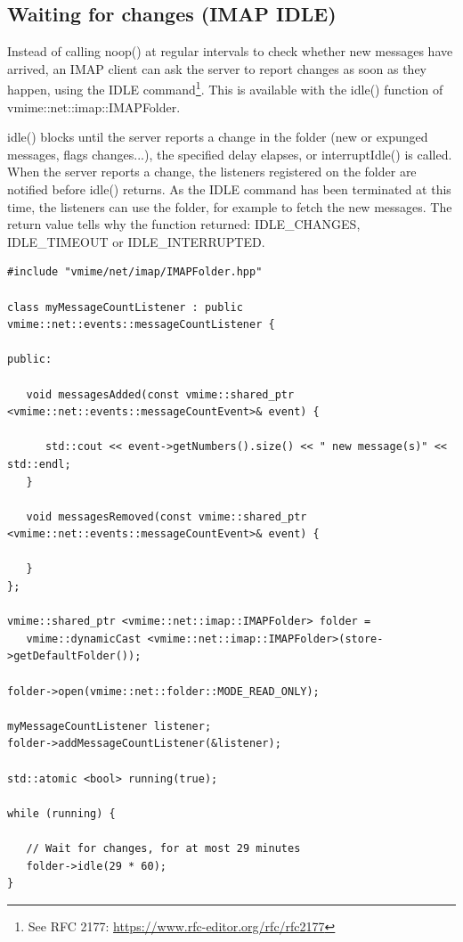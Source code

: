 \subsection{Waiting for changes (IMAP IDLE)} %

Instead of calling {\vcode noop()} at regular intervals to check whether new
messages have arrived, an IMAP client can ask the server to report changes as
soon as they happen, using the IDLE command\footnote{See RFC 2177:
\url{https://www.rfc-editor.org/rfc/rfc2177}}. This is available with the
{\vcode idle()} function of {\vcode vmime::net::imap::IMAPFolder}.

{\vcode idle()} blocks until the server reports a change in the folder (new or
expunged messages, flags changes...), the specified delay elapses, or
{\vcode interruptIdle()} is called. When the server reports a change, the
listeners registered on the folder are notified before {\vcode idle()}
returns. As the IDLE command has been terminated at this time, the listeners
can use the folder, for example to fetch the new messages. The return value
tells why the function returned: {\vcode IDLE\_CHANGES}, {\vcode IDLE\_TIMEOUT}
or {\vcode IDLE\_INTERRUPTED}.

\begin{lstlisting}[caption={Waiting for new messages}]
#include "vmime/net/imap/IMAPFolder.hpp"

class myMessageCountListener : public vmime::net::events::messageCountListener {

public:

   void messagesAdded(const vmime::shared_ptr <vmime::net::events::messageCountEvent>& event) {

      std::cout << event->getNumbers().size() << " new message(s)" << std::endl;
   }

   void messagesRemoved(const vmime::shared_ptr <vmime::net::events::messageCountEvent>& event) {

   }
};

vmime::shared_ptr <vmime::net::imap::IMAPFolder> folder =
   vmime::dynamicCast <vmime::net::imap::IMAPFolder>(store->getDefaultFolder());

folder->open(vmime::net::folder::MODE_READ_ONLY);

myMessageCountListener listener;
folder->addMessageCountListener(&listener);

std::atomic <bool> running(true);

while (running) {

   // Wait for changes, for at most 29 minutes
   folder->idle(29 * 60);
}
\end{lstlisting}

